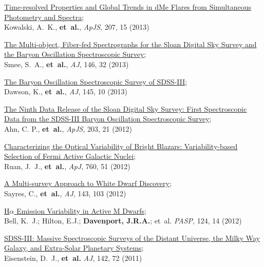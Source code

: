 \documentclass{article}
\begin{document}
\begin{llist}
\begin{etaremune}[leftmargin=10pt]
\item{\sc \href{http://adsabs.harvard.edu/abs/2013ApJS..207...15K}{\color{blue}Time-resolved Properties and Global Trends in dMe Flares from Simultaneous Photometry and Spectra}};\\
Kowalski, A.~K., {\bf et~al.}, {\em ApJS}, 207, 15 (2013)

\item {\sc\href{http://adsabs.harvard.edu/abs/2013AJ....146...32S}{\color{blue}The Multi-object, Fiber-fed Spectrographs for the Sloan Digital Sky Survey and the Baryon Oscillation Spectroscopic Survey}};\\
Smee, S.~A., {\bf et~al.}, {\em AJ}, 146, 32 (2013)

\item {\sc \href{http://adsabs.harvard.edu/abs/2013AJ....145...10D}{\color{blue}The Baryon Oscillation Spectroscopic Survey of SDSS-III}};\\
Dawson, K., {\bf et~al.}, {\em AJ}, 145, 10 (2013)

\item {\sc \href{http://adsabs.harvard.edu/abs/2012ApJS..203...21A}{\color{blue}The Ninth Data Release of the Sloan Digital Sky Survey: First Spectroscopic Data from the SDSS-III Baryon Oscillation Spectroscopic Survey}};\\
Ahn, C. P.,  {\bf et~al.}, {\em ApJS}, 203, 21 (2012)

\item {\sc \href{http://adsabs.harvard.edu/abs/2012ApJ...760...51R}{\color{blue}Characterizing the Optical Variability of Bright Blazars: Variability-based Selection of Fermi Active Galactic Nuclei}};\\
Ruan, J.~J., {\bf et~al.}, {\em ApJ}, 760, 51 (2012)

\item {\sc \href{http://adsabs.harvard.edu/abs/2012AJ....143..103S}{\color{blue}A Multi-survey Approach to White Dwarf Discovery}};\\
Sayres, C., {\bf et~al.}, {\em AJ}, 143, 103 (2012)

\item {\sc \href{http://adsabs.harvard.edu/abs/2012PASP..124...14B}{\color{blue}H$\alpha$ Emission Variability in Active M Dwarfs}};\\
Bell, K.~J.; Hilton, E.J.; {\bf Davenport, J.R.A.}; et~al. {\em PASP}, 124, 14 (2012)

\item {\sc \href{http://adsabs.harvard.edu/abs/2011AJ....142...72E}{\color{blue}SDSS-III: Massive Spectroscopic Surveys of the Distant Universe, the Milky Way Galaxy, and Extra-Solar Planetary Systems}};\\ 
Eisenstein, D.~J., {\bf et~al.} {\em AJ}, 142, 72 (2011)


\end{etaremune}
\end{llist}
\end{document}
